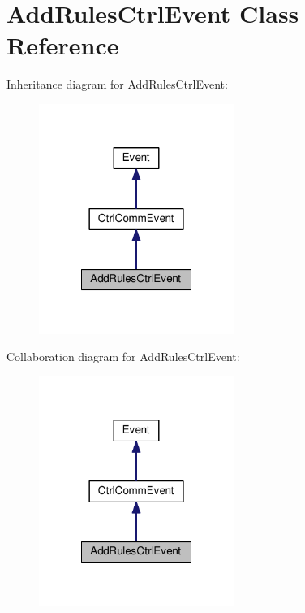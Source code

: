 \hypertarget{classAddRulesCtrlEvent}{}\section{Add\+Rules\+Ctrl\+Event Class Reference}
\label{classAddRulesCtrlEvent}


Inheritance diagram for Add\+Rules\+Ctrl\+Event\+:
\nopagebreak
\begin{figure}[H]
\begin{center}
\leavevmode
\includegraphics[width=180pt]{classAddRulesCtrlEvent__inherit__graph}
\end{center}
\end{figure}


Collaboration diagram for Add\+Rules\+Ctrl\+Event\+:
\nopagebreak
\begin{figure}[H]
\begin{center}
\leavevmode
\includegraphics[width=180pt]{classAddRulesCtrlEvent__coll__graph}
\end{center}
\end{figure}
